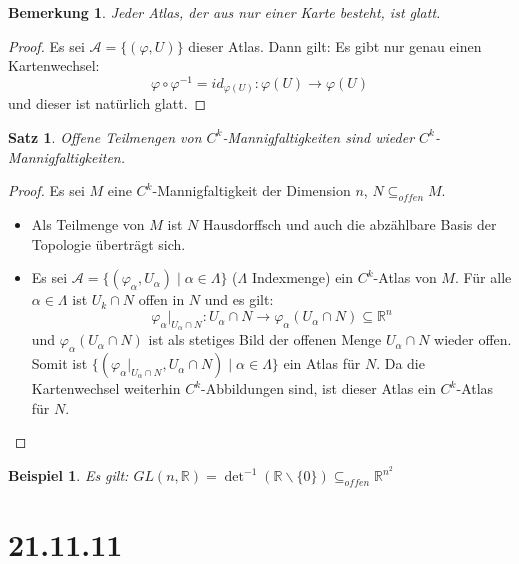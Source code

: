 \documentclass[a4paper,11pt,notitlepage]{report}
\newtheorem{theorem}{Satz}[chapter]
\newtheorem{remark}{Bemerkung}[chapter]
\newtheorem{example}{Beispiel}[chapter]
\newcommand{\R}{{\ensuremath{\mathbb{R}}}}
\begin{document}
\begin{remark}
	Jeder Atlas, der aus nur einer Karte besteht, ist glatt.
\end{remark}

\begin{proof}
	Es sei $\mathcal{A} = \{(\varphi,U)\}$ dieser Atlas. Dann gilt:
	\newline
	Es gibt nur genau einen Kartenwechsel: 
	$$\varphi \circ \varphi^{-1} = id_{\varphi(U)} \colon \varphi(U) \rightarrow \varphi(U)$$ und dieser ist natürlich glatt.
\end{proof}

\begin{theorem}
	Offene Teilmengen von $C^k$-Mannigfaltigkeiten sind wieder $C^k$-Mannigfaltigkeiten.
\end{theorem}

\begin{proof}
	Es sei $M$ eine $C^k$-Mannigfaltigkeit der Dimension $n$, $N \subseteq_{offen} M$.
	\begin{itemize}
		\item Als Teilmenge von $M$ ist $N$ Hausdorffsch und auch die abzählbare Basis der Topologie überträgt sich.
		\item Es sei $\mathcal{A} = \{(\varphi_\alpha, U_\alpha) \mid \alpha \in \Lambda \}$ ($\Lambda$ Indexmenge) ein $C^k$-Atlas von $M$.
		\newline
		Für alle $\alpha \in \Lambda$ ist $U_k \cap N$ offen in $N$ und es gilt:
		$$\varphi_\alpha \big |_{U_\alpha \cap N} \colon U_\alpha \cap N \rightarrow \varphi_\alpha(U_\alpha \cap N) \subseteq \R^n$$
		und $\varphi_\alpha(U_\alpha \cap N)$ ist als stetiges Bild der offenen Menge $U_\alpha \cap N$ wieder offen.
		\newline
		Somit ist $\{(\varphi_\alpha \big |_{U_\alpha \cap N}, U_\alpha \cap N) \mid \alpha \in \Lambda\}$ ein Atlas für $N$.
		\newline
		Da die Kartenwechsel weiterhin $C^k$-Abbildungen sind, ist dieser Atlas ein $C^k$-Atlas für $N$.
	\end{itemize}
\end{proof}

\begin{example}
	Es gilt: $GL(n,\R) = \det^{-1}(\R \backslash \{0\}) \subseteq_{offen} \R^{n^2}$
\end{example}

\chapter{21.11.11}
\end{document}
